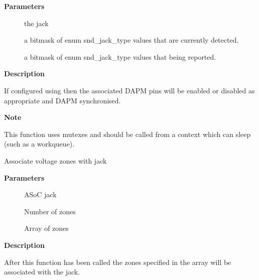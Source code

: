 \documentclass[a4paper,8pt,english]{sphinxmanual}
\begin{document}
\textbf{Parameters}
\begin{description}
\item[{}] \leavevmode
the jack

\item[{}] \leavevmode
a bitmask of enum snd\_jack\_type values that are currently detected.

\item[{}] \leavevmode
a bitmask of enum snd\_jack\_type values that being reported.

\end{description}

\textbf{Description}

If configured using {\hyperref[sound/kernel\string-api/alsa\string-driver\string-api:c.snd_soc_jack_add_pins]{\emph{}}} then the associated
DAPM pins will be enabled or disabled as appropriate and DAPM
synchronised.

\textbf{Note}

This function uses mutexes and should be called from a
context which can sleep (such as a workqueue).

\begin{fulllineitems}
\label{sound/kernel-api/alsa-driver-api:c.snd_soc_jack_add_zones}
Associate voltage zones with jack

\end{fulllineitems}


\textbf{Parameters}
\begin{description}
\item[{}] \leavevmode
ASoC jack

\item[{}] \leavevmode
Number of zones

\item[{}] \leavevmode
Array of zones

\end{description}

\textbf{Description}

After this function has been called the zones specified in the
array will be associated with the jack.
\end{document}
